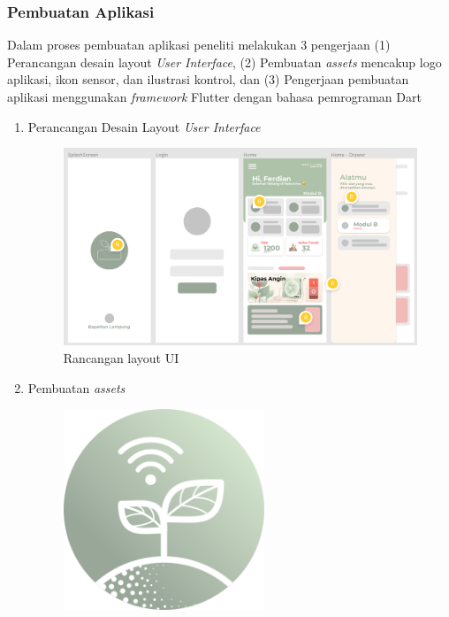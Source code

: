 \begin{flushleft}
\begin{justify}
        \subsubsection{Pembuatan Aplikasi}
        Dalam proses pembuatan aplikasi peneliti melakukan 3 pengerjaan (1) Perancangan desain layout \textit{User Interface}, (2) Pembuatan \textit{assets} mencakup logo aplikasi, ikon sensor, dan ilustrasi kontrol, dan (3) Pengerjaan pembuatan aplikasi menggunakan \textit{framework} Flutter dengan bahasa pemrograman Dart
        \begin{enumerate}
            \item Perancangan Desain Layout \textit{User Interface}
            \begin{figure}[ht]
                \centering
                \includegraphics[width=15cm]{images/UI/summary.png}
                \caption{Rancangan layout UI}
            \end{figure}
            \vspace{10cm}
            \item Pembuatan \textit{assets}\\
            \begin{figure}[ht]
                \centering
                \includegraphics[width=6cm]{images/logo.png}

\end{figure}
\end{enumerate}
\end{justify}
\end{flushleft}
